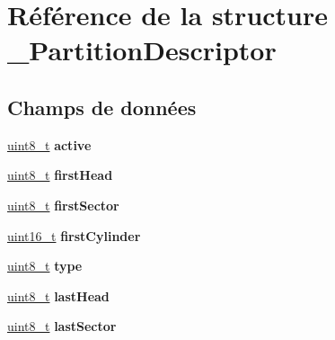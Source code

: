 \hypertarget{struct__PartitionDescriptor}{\section{Référence de la structure \-\_\-\-Partition\-Descriptor}
\label{struct__PartitionDescriptor}
}
\subsection*{Champs de données}
\begin{DoxyCompactItemize}
\item 
\hypertarget{struct__PartitionDescriptor_a7f5b269065ec0ed8f65a1bc00afd712e}{\hyperlink{types_8h_aba7bc1797add20fe3efdf37ced1182c5}{uint8\-\_\-t} {\bfseries active}}\label{struct__PartitionDescriptor_a7f5b269065ec0ed8f65a1bc00afd712e}

\item 
\hypertarget{struct__PartitionDescriptor_afb7ff15b362251f2788db0ba5c399f9a}{\hyperlink{types_8h_aba7bc1797add20fe3efdf37ced1182c5}{uint8\-\_\-t} {\bfseries first\-Head}}\label{struct__PartitionDescriptor_afb7ff15b362251f2788db0ba5c399f9a}

\item 
\hypertarget{struct__PartitionDescriptor_a0ea29bb1a4577930c23316f4aa76f7fe}{\hyperlink{types_8h_aba7bc1797add20fe3efdf37ced1182c5}{uint8\-\_\-t} {\bfseries first\-Sector}}\label{struct__PartitionDescriptor_a0ea29bb1a4577930c23316f4aa76f7fe}

\item 
\hypertarget{struct__PartitionDescriptor_a10bc83fdf064e25cc7aca555f047b70e}{\hyperlink{types_8h_adf4d876453337156dde61095e1f20223}{uint16\-\_\-t} {\bfseries first\-Cylinder}}\label{struct__PartitionDescriptor_a10bc83fdf064e25cc7aca555f047b70e}

\item 
\hypertarget{struct__PartitionDescriptor_a2ada512534c41aa57e4bb351d594bfa8}{\hyperlink{types_8h_aba7bc1797add20fe3efdf37ced1182c5}{uint8\-\_\-t} {\bfseries type}}\label{struct__PartitionDescriptor_a2ada512534c41aa57e4bb351d594bfa8}

\item 
\hypertarget{struct__PartitionDescriptor_ad88abb3baf9aacb18c2718c186f67d02}{\hyperlink{types_8h_aba7bc1797add20fe3efdf37ced1182c5}{uint8\-\_\-t} {\bfseries last\-Head}}\label{struct__PartitionDescriptor_ad88abb3baf9aacb18c2718c186f67d02}

\item 
\hypertarget{struct__PartitionDescriptor_a3630bb7241f436168573845c5f0fb51c}{\hyperlink{types_8h_aba7bc1797add20fe3efdf37ced1182c5}{uint8\-\_\-t} {\bfseries last\-Sector}}\label{struct__PartitionDescriptor_a3630bb7241f436168573845c5f0fb51c}


\end{DoxyCompactItemize}

